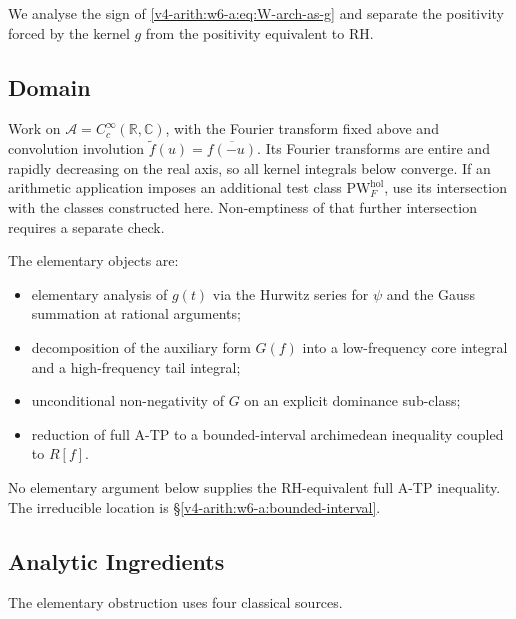We analyse the sign of \eqref{v4-arith:w6-a:eq:W-arch-as-g} and
separate the positivity forced by the kernel \(g\) from the positivity
equivalent to RH.

\subsection{Domain}
\label{v4-arith:w6-a:domain}

Work on \(\mathscr A=C_c^\infty(\mathbb R,\mathbb C)\), with the
Fourier transform fixed above and convolution involution
\(\widetilde f(u)=\overline{f(-u)}\). Its Fourier transforms are
entire and rapidly decreasing on the real axis, so all kernel
integrals below converge. If an arithmetic application imposes an
additional test class \(\mathrm{PW}^{\mathrm{hol}}_F\), use its
intersection with the classes constructed here. Non-emptiness of
that further intersection requires a separate check.

The elementary objects are:
\begin{itemize}
\item elementary analysis of \(g(t)\) via the Hurwitz series for \(\psi\)
and the Gauss summation at rational arguments;
\item decomposition of the auxiliary form \(G(f)\) into a
low-frequency core integral and a high-frequency tail integral;
\item unconditional non-negativity of \(G\) on an explicit
dominance sub-class;
\item reduction of full A-TP to a bounded-interval archimedean
inequality coupled to \(R[f]\).
\end{itemize}

No elementary argument below supplies the RH-equivalent full A-TP
inequality. The irreducible location is
\S\ref{v4-arith:w6-a:bounded-interval}.

\subsection{Analytic Ingredients}
\label{v4-arith:w6-a:sources}

The elementary obstruction uses four classical sources.

